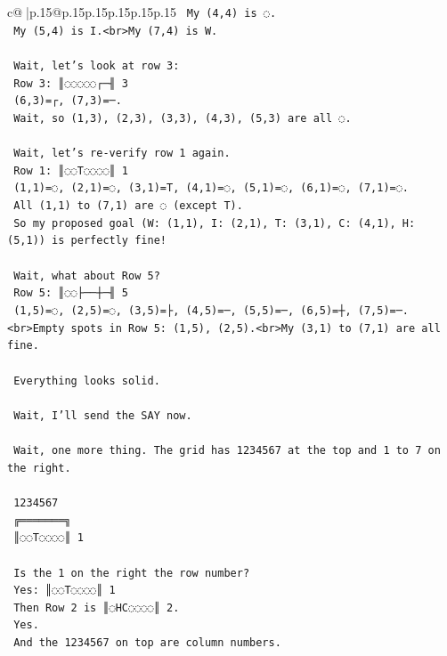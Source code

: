 \documentclass{article}
\begin{document}
{\begin{supertabular}{c@{$\;$}|p{.15\linewidth}@{}p{.15\linewidth}p{.15\linewidth}p{.15\linewidth}p{.15\linewidth}p{.15\linewidth}}
{{{\texttt{    My (4,4) is ◌.} \\
\texttt{    My (5,4) is I.<br>My (7,4) is W.} \\
\\ 
\texttt{    Wait, let's look at row 3:} \\
\texttt{    Row 3: ║◌◌◌◌◌┌─╢ 3} \\
\texttt{    (6,3)=┌, (7,3)=─.} \\
\texttt{    Wait, so (1,3), (2,3), (3,3), (4,3), (5,3) are all ◌.} \\
\\ 
\texttt{    Wait, let's re{-}verify row 1 again.} \\
\texttt{    Row 1: ║◌◌T◌◌◌◌║ 1} \\
\texttt{    (1,1)=◌, (2,1)=◌, (3,1)=T, (4,1)=◌, (5,1)=◌, (6,1)=◌, (7,1)=◌.} \\
\texttt{    All (1,1) to (7,1) are ◌ (except T).} \\
\texttt{    So my proposed goal (W: (1,1), I: (2,1), T: (3,1), C: (4,1), H: (5,1)) is perfectly fine!} \\
\\ 
\texttt{    Wait, what about Row 5?} \\
\texttt{    Row 5: ║◌◌├──┼─╢ 5} \\
\texttt{    (1,5)=◌, (2,5)=◌, (3,5)=├, (4,5)=─, (5,5)=─, (6,5)=┼, (7,5)=─.<br>Empty spots in Row 5: (1,5), (2,5).<br>My (3,1) to (7,1) are all fine.} \\
\\ 
\texttt{    Everything looks solid.} \\
\\ 
\texttt{    Wait, I'll send the SAY now.} \\
\\ 
\texttt{    Wait, one more thing. The grid has 1234567 at the top and 1 to 7 on the right.} \\
\\ 
\texttt{     1234567} \\
\texttt{    ╔═══════╗} \\
\texttt{    ║◌◌T◌◌◌◌║ 1} \\
\\ 
\texttt{    Is the 1 on the right the row number?} \\
\texttt{    Yes: ║◌◌T◌◌◌◌║ 1} \\
\texttt{    Then Row 2 is ║◌HC◌◌◌◌║ 2.} \\
\texttt{    Yes.} \\
\texttt{    And the 1234567 on top are column numbers.} \\
}}}
\end{supertabular}}
\end{document}
